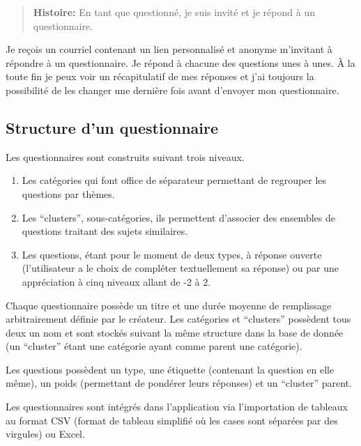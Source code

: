 \documentclass[12pt,a4paper]{book}
\begin{document}
\begin{quote}
  \textbf{Histoire:} En tant que questionné, je suis invité et je répond à un questionnaire.
\end{quote}

Je reçois un courriel contenant un lien personnalisé et anonyme m'invitant à répondre à un questionnaire. Je répond à chacune des questions unes à unes. À la toute fin je peux voir un récapitulatif de mes réponses et j'ai toujours la possibilité de les changer une dernière fois avant d'envoyer mon questionnaire.

\subsection{Structure d'un questionnaire}

Les questionnaires sont construits suivant trois niveaux. 

\begin{enumerate}
  \item Les catégories qui font office de séparateur permettant de regrouper les questions par thèmes.
  \item Les ``clusters'', sous-catégories, ils permettent d'associer des ensembles de questions traitant des sujets similaires.
  \item Les questions, étant pour le moment de deux types, à réponse ouverte (l'utilisateur a le choix de compléter textuellement sa réponse) ou par une appréciation à cinq niveaux allant de -2 à 2.
\end{enumerate}

Chaque questionnaire possède un titre et une durée moyenne de remplissage arbitrairement définie par le créateur. Les catégories et ``clusters'' possèdent tous deux un nom et sont stockés suivant la même structure dans la base de donnée (un ``cluster'' étant une catégorie ayant comme parent une catégorie).

Les questions possèdent un type, une étiquette (contenant la question en elle même), un poids (permettant de pondérer leurs réponses) et un ``cluster'' parent.

Les questionnaires sont intégrés dans l'application via l'importation de tableaux au format CSV (format de tableau simplifié où les cases sont séparées par des virgules) ou Excel.
\end{document}

